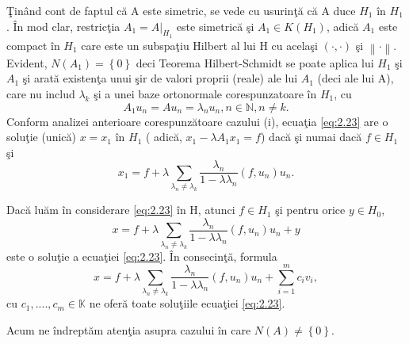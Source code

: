 \documentclass[a4paper,12pt,oneside]{report}
\begin{document}
\noindent \c{T}in\^{a}nd cont de faptul c\u{a} A este simetric, se vede cu usurin\c{t}\u{a} c\u{a} A duce \(H_{1}\) \^{i}n \(H_{1}\). \^{I}n mod clar, restric\c{t}ia \(A_{1} = A|_{H_{1}}\) este simetric\u{a} \c{s}i \(A_{1} \in K\left ( H_{1} \right )\), adic\u{a} \(A_{1}\) este compact \^{i}n \(H_{1}\)  care este un subspa\c{t}iu Hilbert al lui H cu acela\c{s}i \(\left ( \cdot ,\cdot  \right )\) \c{s}i \(\left \| \cdot  \right \|\). Evident, \(N\left ( A_{1} \right ) = \left \{ 0 \right \}\) deci Teorema Hilbert-Schmidt se poate aplica lui \(H_{1}\) \c{s}i \(A_{1}\) \c{s}i arat\u{a} existen\c{t}a unui \c{s}ir de valori proprii (reale) ale lui \(A_{1}\) (deci ale lui A), care nu includ \(\lambda _{k}\) \c{s}i a unei baze ortonormale corespunzatoare \^{i}n \(H_{1}\), cu
\begin{displaymath}
A_{1}u_{n} = Au_{n} = \lambda _{n}u_{n}, n\in\mathbb{N}, n\neq k.
\end{displaymath}
Conform analizei anterioare corespunz\u{a}toare cazului (i), ecua\c{t}ia \ref{eq:2.23} are o solu\c{t}ie (unic\u{a}) \(x = x_{1}\) \^{i}n \(H_{1}\) ( adic\u{a}, \(x_{1} - \lambda A_{1}x_{1} = f\)) dac\u{a} \c{s}i numai dac\u{a} \(f\in H_{1}\) \c{s}i
\begin{displaymath}
x_{1} = f + \lambda \sum_{\lambda_{n}\neq \lambda_{k}}\frac{\lambda_{n}}{1 - \lambda \lambda _{n}}\left ( f, u_{n} \right )u_{n}.
\end{displaymath}

\noindent	Dac\u{a} lu\u{a}m \^{i}n considerare \ref{eq:2.23} \^{i}n H, atunci \(f\in H_{1}\) \c{s}i pentru orice \(y\in H_{0}\),
\begin{displaymath}
x = f+ \lambda \sum_{\lambda_{n}\neq \lambda_{k}}\frac{\lambda_{n}}{1 - \lambda \lambda _{n}}\left ( f, u_{n} \right )u_{n} + y
\end{displaymath}
este o solu\c{t}ie a ecua\c{t}iei \ref{eq:2.23}. \^{I}n consecin\c{t}\u{a}, formula
\begin{displaymath}
x = f+ \lambda \sum_{\lambda_{n}\neq \lambda_{k}}\frac{\lambda_{n}}{1 - \lambda \lambda _{n}}\left ( f, u_{n} \right )u_{n} + \sum_{i=1}^{m}c_{i}v_{i}, \label{eq:2.31} \tag{2.31}
\end{displaymath}
cu \(c_{1},....,c_{m} \in\mathbb{K}\) ne ofer\u{a} toate solu\c{t}iile ecua\c{t}iei \ref{eq:2.23}.

\noindent Acum ne \^{i}ndrept\u{a}m aten\c{t}ia asupra cazului \^{i}n care \(N\left ( A \right ) \neq \left \{  0\right \}\).
\end{document}
